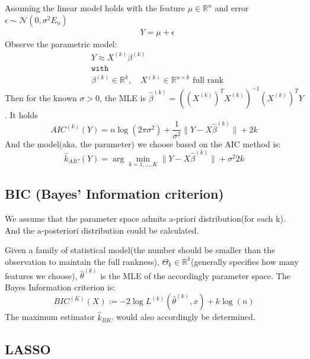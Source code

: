 \begin{theorem}
Assuming the linear model holds with the feature $\mu \in \mathbb{R}^n$ and error $\epsilon \sim \mathcal{N}(0, \sigma^2 E_n)$
\begin{align*}
	& Y = \mu + \epsilon
\end{align*}
Observe the parametric model:
\begin{align*}
	&Y \approx X^{(k)} \beta^{(k)}\\
	&\texttt{with}\\
	&\beta^{(k)} \in \mathbb{R}^k , \quad X^{(k)} \in \mathbb{R}^{n \times k} \text{ full rank}
\end{align*}
 Then for the known $\sigma > 0$, the MLE is $\hat{\beta}^{(k)} = ((X^{(k)})^T X^{(k)})^{-1} (X^{(k)})^T Y$. It holds
\begin{equation}
    AIC^{(k)}(Y) = n \log (2\pi \sigma^2) + \frac{1}{\sigma^2} \|Y - X\hat{\beta}^{(k)} \| + 2k
\end{equation}
And the model(aka. the parameter) we choose based on the AIC method is:
\begin{equation}
    \hat{k}_{AIC}(Y) = \arg\min_{k = 1, \dots, K} \|Y - X\hat{\beta}^{(k)} \| + \sigma^2 2k
\end{equation}
\end{theorem}



\subsection{BIC (Bayes' Information criterion)}
We assume that the parameter space admits a-priori distribution(for each k). And the a-posteriori distribution could be calculated. 

\begin{definition}
Given a family of statistical model(the number should be smaller than the observation to maintain the full rankness), $\Theta_k \in \mathbb{R}^k$(generally specifies how many features we choose), $\hat{\theta}^{(k)}$ is the MLE of the accordingly parameter space. The Bayes Information criterion is:
\begin{equation}
    BIC^{(K)}(X) := -2\log L^{(k)}(\hat{\theta}^{(k)}, x) + k\log(n)
\end{equation}
The maximum estimator $\hat{k}_{BIC}$ would also accordingly be determined. 
\end{definition}


\subsection{LASSO}


